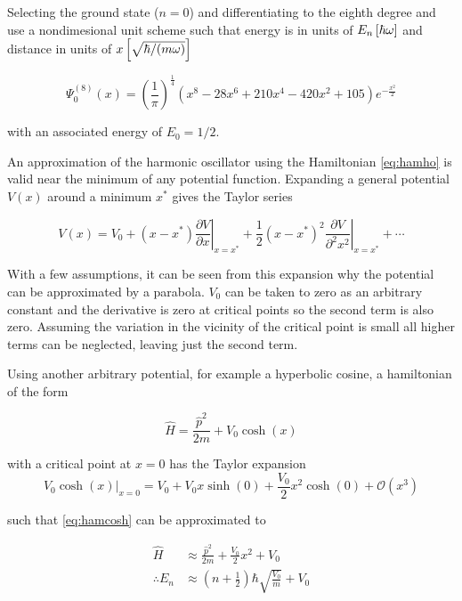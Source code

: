 Selecting the ground state ($n=0$) and differentiating to the eighth degree and use a nondimesional unit scheme such that energy is in units of $\cramped{E_n \left[\hbar\omega\right]}$ and distance in units of $\cramped{x \left[\sqrt{\hbar/(m\omega)}\right]}$

\begin{equation}
\Psi_0^{(8)}(x) = \left(\frac{1}{\pi}\right)^{\frac{1}{4}}\left(x^8-28x^6+210x^4-420x^2+105\right)e^{-\frac{x^2}{2}}
\label{eq:wfndimless}
\end{equation}

with an associated energy of $E_0 = 1/2$.

An approximation of the harmonic oscillator using the Hamiltonian \cref{eq:hamho} is valid near the minimum of any potential function.
Expanding a general potential $V(x)$ around a minimum $x^*$ gives the Taylor series

\begin{equation}
V(x) = V_0 +(x-x^*)\left.\frac{\partial V}{\partial x}\right|_{x=x^*}+\frac{1}{2}(x-x^*)^2\left.\frac{\partial V}{\partial^2 x^2}\right|_{x=x^*}+\cdots
\end{equation}

With a few assumptions, it can be seen from this expansion why the potential can be approximated by a parabola.
$V_0$ can be taken to zero as an arbitrary constant and the derivative is zero at critical points so the second term is also zero.
Assuming the variation in the vicinity of the critical point is small all higher terms can be neglected, leaving just the second term.

Using another arbitrary potential, for example a hyperbolic cosine, a hamiltonian of the form

\begin{equation}
\widehat{H} = \frac{\widehat{p}^2}{2m}+V_0\cosh(x)\label{eq:hamcosh}
\end{equation}

with a critical point at $x=0$ has the Taylor expansion
\begin{equation}
\left.V_0\cosh(x)\right|_{x=0} = V_0+V_0x\sinh(0)+\frac{V_0}{2}x^2\cosh(0)+\mathcal{O}(x^3)
\end{equation}

such that \cref{eq:hamcosh} can be approximated to

\begin{align}
\widehat{H} &\approx \frac{\widehat{p}^2}{2m}+\frac{V_0}{2}x^2+V_0\label{eq:hamtexp}\\
\therefore E_n &\approx \left(n+\frac{1}{2}\right)\hbar\sqrt{\frac{V_0}{m}}+V_0
\end{align}

